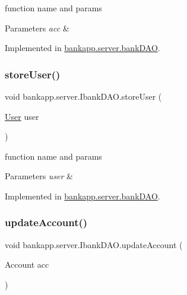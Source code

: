 function name and params 


\begin{DoxyParams}{Parameters}
{\em acc} & \\
\hline
\end{DoxyParams}


Implemented in \hyperlink{classbankapp_1_1server_1_1bankDAO_a0023f065d21c23dd9b952339fd832d7e}{bankapp.\+server.\+bank\+D\+AO}.

\mbox{\label{interfacebankapp_1_1server_1_1IbankDAO_a9cb41e7c04366f4ec9cfcb74d43ee37f}} 
\subsubsection{\texorpdfstring{store\+User()}{storeUser()}}
{\footnotesize\ttfamily void bankapp.\+server.\+Ibank\+D\+A\+O.\+store\+User (\begin{DoxyParamCaption}\item[{\hyperlink{classbankapp_1_1server_1_1User}{User}}]{user }\end{DoxyParamCaption})}



function name and params 


\begin{DoxyParams}{Parameters}
{\em user} & \\
\hline
\end{DoxyParams}


Implemented in \hyperlink{classbankapp_1_1server_1_1bankDAO_a2026e5f30e2342995dddfc654a37d640}{bankapp.\+server.\+bank\+D\+AO}.

\mbox{\label{interfacebankapp_1_1server_1_1IbankDAO_a0ee7aa6b093e2695955296dd72411b0c}} 
\subsubsection{\texorpdfstring{update\+Account()}{updateAccount()}}
{\footnotesize\ttfamily void bankapp.\+server.\+Ibank\+D\+A\+O.\+update\+Account (\begin{DoxyParamCaption}\item[{Account}]{acc }\end{DoxyParamCaption})}



